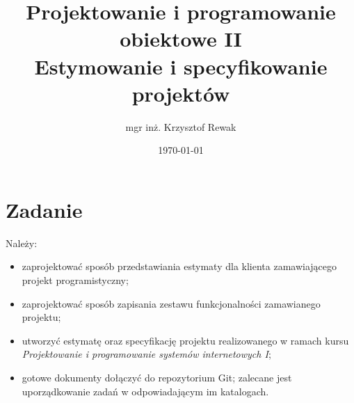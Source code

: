 \documentclass{article}
\title{
	Projektowanie i programowanie obiektowe II\\
	\Huge{Estymowanie i specyfikowanie projektów}
}
\author{mgr inż. Krzysztof Rewak}
\date{\today}
\begin{document}
	\maketitle
	
	\section{Zadanie}
	Należy:
	\begin{itemize}
		\item zaprojektować sposób przedstawiania estymaty dla klienta zamawiającego projekt programistyczny;
		\item zaprojektować sposób zapisania zestawu funkcjonalności zamawianego projektu;
		\item utworzyć estymatę oraz specyfikację projektu realizowanego w ramach kursu \emph{Projektowanie i programowanie systemów internetowych I};
		\item gotowe dokumenty dołączyć do repozytorium Git; zalecane jest uporządkowanie zadań w odpowiadającym im katalogach.
	\end{itemize}
\end{document}
